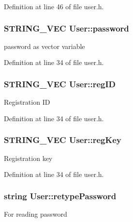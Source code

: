 Definition at line 46 of file user.\-h.

\hypertarget{classUser_a77b451700a9695b2a0905a12f8aedd44}{
\subsubsection[{password}]{\setlength{\rightskip}{0pt plus 5cm}S\-T\-R\-I\-N\-G\-\_\-\-V\-E\-C User\-::password\hspace{0.3cm}{\ttfamily [protected]}}}\label{classUser_a77b451700a9695b2a0905a12f8aedd44}
password as vector variable 

Definition at line 34 of file user.\-h.

\hypertarget{classUser_a06abd54eca25f11ccdb4c326812e34ee}{
\subsubsection[{reg\-I\-D}]{\setlength{\rightskip}{0pt plus 5cm}S\-T\-R\-I\-N\-G\-\_\-\-V\-E\-C User\-::reg\-I\-D\hspace{0.3cm}{\ttfamily [protected]}}}\label{classUser_a06abd54eca25f11ccdb4c326812e34ee}
Registration I\-D 

Definition at line 34 of file user.\-h.

\hypertarget{classUser_a8753abeefb69d3c9db3c585992c7944f}{
\subsubsection[{reg\-Key}]{\setlength{\rightskip}{0pt plus 5cm}S\-T\-R\-I\-N\-G\-\_\-\-V\-E\-C User\-::reg\-Key\hspace{0.3cm}{\ttfamily [protected]}}}\label{classUser_a8753abeefb69d3c9db3c585992c7944f}
Registration key 

Definition at line 34 of file user.\-h.

\hypertarget{classUser_af51ac37cc65721f03e592311d7ead4d4}{
\subsubsection[{retype\-Password}]{\setlength{\rightskip}{0pt plus 5cm}string User\-::retype\-Password\hspace{0.3cm}{\ttfamily [protected]}}}\label{classUser_af51ac37cc65721f03e592311d7ead4d4}
For reading password 

